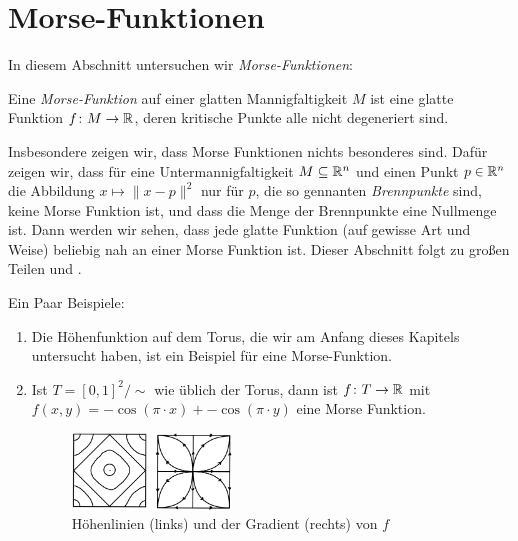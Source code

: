 \section{Morse-Funktionen}

In diesem Abschnitt untersuchen wir \textit{Morse-Funktionen}:

\begin{definition}
    \label{satz: morse-funktion}
    Eine \textit{Morse-Funktion} auf einer glatten Mannigfaltigkeit $M$ ist eine glatte Funktion
    $f \colon M \to { \mathbb R }$, deren kritische Punkte alle nicht degeneriert sind.
\end{definition}

Insbesondere zeigen wir, dass Morse Funktionen nichts besonderes sind. Dafür zeigen wir, dass für 
eine Untermannigfaltigkeit $M \subseteq { \mathbb R }^n$ und einen Punkt $p \in { \mathbb R }^n$ die Abbildung
$x \mapsto \| x - p \|^2$ nur für $p$, die so gennanten \textit{Brennpunkte}
sind, keine Morse Funktion ist, und dass die Menge der Brennpunkte eine Nullmenge ist. Dann werden
wir sehen, dass jede glatte Funktion (auf gewisse Art und Weise) beliebig nah an einer Morse 
Funktion ist. Dieser Abschnitt folgt zu großen Teilen \cite{milnor} und \cite{audin}.

\begin{example}
    \label{bsp: morse funktion}
    Ein Paar Beispiele:
    \begin{enumerate}
        \item Die Höhenfunktion auf dem Torus, die wir am Anfang dieses Kapitels untersucht haben, ist 
            ein Beispiel für eine Morse-Funktion.
        \item Ist $T = [0, 1]^2 / \sim$ wie üblich der Torus, dann ist $f \colon T \to { \mathbb R }$ mit 
            $f(x, y) = -\cos(\pi \cdot x) + -\cos(\pi \cdot y)$ eine Morse Funktion. 
            \begin{figure}[H]
                \centering
                \includegraphics[width=0.4\textwidth]{../resources/morse-funktion-torus.jpeg}
                \caption{Höhenlinien (links) und der Gradient (rechts) von $f$}
            \end{figure}
    \end{enumerate}
\end{example}

